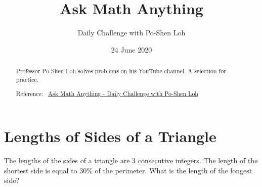 \documentclass[12pt]{article}
\title{Ask Math Anything}
\author{Daily Challenge with Po-Shen Loh}
\date{24 June 2020}
\begin{document}
\begin{minipage}{\textwidth}
\maketitle
\begin{abstract}
Professor Po-Shen Loh solves problems on his YouTube channel. A selection for practice. 

Reference:~ 
\href{https://www.youtube.com/channel/UCf78EJOm4wQ4xXwSS15PuxQ}{Ask Math Anything - Daily Challenge with Po-Shen Loh}
\end{abstract}
\end{minipage}


\section*{Lengths of Sides of a Triangle}
The lengths of the sides of a triangle are $3$ consecutive integers. The length of the shortest side is equal to $30\%$ of the perimeter. What is the length of the longest side?
\begin{center}
\end{center}
\end{document}
